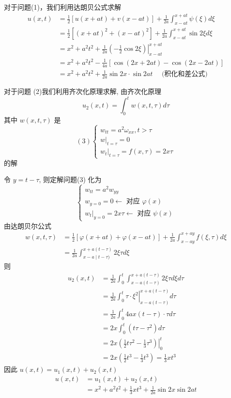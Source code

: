 \begin{questions}
\begin{solution}
对于问题(1)，我们利用达朗贝公式求解
$$
\begin{aligned}
u(x, t) & =\frac{1}{2}[u(x+a t)+v(x-a t)]+\frac{1}{2 a} \int_{x-a t}^{x+a t} \psi(\xi) d \xi \\
& =\frac{1}{2}\left[(x+a t)^{2}+(x-a t)^{2}\right]+\frac{1}{2 a} \int_{x-a t}^{x+a t} \sin 2 \xi d \xi \\
& =x^{2}+a^{2} t^{2}+\left.\frac{1}{2 a}\left(-\frac{1}{2} \cos 2 \xi\right)\right|_{x-a t} ^{x+a t} \\
& =x^{2}+a^{2} t^{2}-\frac{1}{4 a}[\cos (2 x+2 a t)-\cos (2 x-2 a t)] \\
& =x^{2}+a^{2} t^{2}+\frac{1}{2 a} \sin 2 x \cdot \sin 2 a t \quad \text { (积化和差公式) }
\end{aligned}
$$

对于问题 (2)我们利用齐次化原理求解, 由齐次化原理
$$
 u_{2}(x, t)=\int_{0}^{t} w(x, t, \tau) d \tau
$$
其中 $ w(x, t, \tau) $ 是  
$$ (3) \left\{\begin{array}{l}w_{t t}=a^{2} \omega_{x x}, t>\tau \\ \left.w\right|_{t=\tau}=0 \\ \left.w_{t}\right|_{t=\tau}=f(x, \tau)=2 x \tau\end{array}\right. $$
的解

令 $ y=t-\tau $, 则定解问题(3) 化为
$$
\left\{\begin{array}{l}
w_{t t}=a^{2} w_{y y} \\
w_{y=0}=0 \leftarrow \text { 对应 } \varphi(x) \\
\left.w_{t}\right|_{y=0}=2 x \tau \leftarrow \text { 对应 } \psi(x)
\end{array}\right.
$$
由达朗贝尔公式
$$
\begin{aligned}
w(x, t, \tau) & =\frac{1}{2}[\varphi(x+a t)+\varphi(x-a t)]+\frac{1}{2 a} \int_{x-a y}^{x+a y} f(\xi, \tau) d \xi \\
& =\frac{1}{2 a} \int_{x-a \mid t-\tau)}^{x+a(t-\tau)} 2 \xi \tau d \xi
\end{aligned}
$$
则 
$$
\begin{aligned}
 u_{2}(x, t)&=\frac{1}{2 a} \int_{0}^{t} \int_{x-a(t-\tau)}^{x+a(t-\tau)} 2 \xi \tau d \xi d \tau \\
&=\left.\frac{1}{2 a} \int_{0}^{t} \tau \cdot \xi^{2}\right|_{x-a(t-\tau)} ^{x+a(t-\tau)} d \tau \\
&=\frac{1}{2 a} \int_{0}^{t} 4 a x(t-\tau) \cdot \tau d \tau \\
&=2x \int_{0}^{t}\left(t \tau-\tau^{2}\right) d \tau \\
&=2\left.x\left(\frac{1}{2} t \tau^{2}-\frac{1}{3} \tau^{3}\right)\right|_{0} ^{t} \\
&=2x\left(\frac{1}{2} t^{3}-\frac{1}{3} t^{3}\right)=\frac{1}{3} x t^{3}
\end{aligned}
$$
因此 $ u(x, t)=u_{1}(x, t)+u_{2}(x, t) $
$$
\begin{aligned}
u(x,t) & =u_{1}(x, t)+u_{2}(x, t) \\
& =x^{2}+a^{2} t^{2}+\frac{1}{3} x t^{3}+\frac{1}{2 a} \sin 2 x \sin 2 a t
\end{aligned}
$$


\end{solution}
\end{questions}
